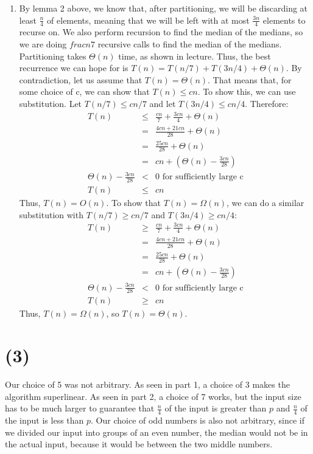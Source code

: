 \documentclass[12pt]{article}
\begin{document}
\begin{enumerate}[label=(\alph*)]
  \item By lemma 2 above, we know that, after partitioning, we will be discarding at least $\frac{n}{4}$ of elements, meaning that we will be left with at most $\frac{3n}{4}$ elements to recurse on. We also perform recursion to find the median of the medians, so we are doing $frac{n}{7}$ recursive calls to find the median of the medians. Partitioning takes $\Theta(n)$ time, as shown in lecture. Thus, the best recurrence we can hope for is $T(n) = T(n/7) + T(3n/4) + \Theta(n)$. By contradiction, let us assume that $T(n) = \Theta(n)$. That means that, for some choice of c, we can show that $T(n) \le cn$. To show this, we can use substitution. Let $T(n/7) \le cn/7$ and let $T(3n/4) \le cn/4$. Therefore:
  \begin{eqnarray*}
  T(n) &\le& \frac{cn}{7} + \frac{3cn}{4} + \Theta(n)\\
  &=& \frac{4cn + 21cn}{28} + \Theta(n)\\
  &=& \frac{25cn}{28} + \Theta(n)\\
  &=& cn + (\Theta(n) - \frac{3cn}{28})\\
  \Theta(n) - \frac{3cn}{28} &<& 0 \text{ for sufficiently large c}\\
  T(n) &\le& cn
  \end{eqnarray*}
  Thus, $T(n) = O(n)$.
  To show that $T(n) = \Omega(n)$, we can do a similar substitution with $T(n/7) \ge cn/7$ and $T(3n/4) \ge cn/4$:
   \begin{eqnarray*}
  T(n) &\ge& \frac{cn}{7} + \frac{3cn}{4} + \Theta(n)\\
  &=& \frac{4cn + 21cn}{28} + \Theta(n)\\
  &=& \frac{25cn}{28} + \Theta(n)\\
  &=& cn + (\Theta(n) - \frac{3cn}{28})\\
  \Theta(n) - \frac{3cn}{28} &<& 0 \text{ for sufficiently large c}\\
  T(n) &\ge& cn
  \end{eqnarray*}
  Thus, $T(n) = \Omega(n)$, so $T(n) = \Theta(n)$.
\end{enumerate}

\section*{(3)}
Our choice of 5 was not arbitrary. As seen in part 1, a choice of 3 makes the algorithm superlinear. As seen in part 2, a choice of 7 works, but the input size has to be much larger to guarantee that $\frac{n}{4}$ of the input is greater than $p$ and $\frac{n}{4}$ of the input is less than $p$. Our choice of odd numbers is also not arbitrary, since if we divided our input into groups of an even number, the median would not be in the actual input, because it would be between the two middle numbers.
\end{document}
